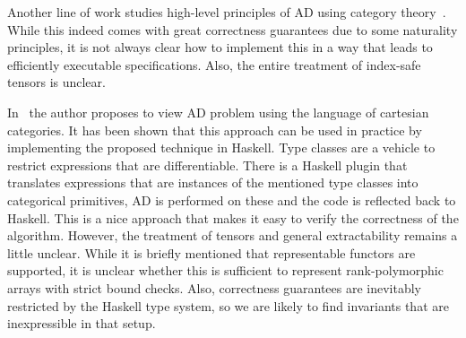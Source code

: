 Another line of work studies high-level principles of AD using
category theory~\cite{ad-theor1, ad-theor2, ad-theor3}.
While this indeed comes with great correctness guarantees due to
some naturality principles, it is not always clear how to implement
this in a way that leads to efficiently executable specifications.  Also, the
entire treatment of index-safe tensors is unclear.

In~\cite{ad-elliott} the author proposes to view AD problem using
the language of cartesian categories.  It has been shown that
this approach can be used in practice by implementing the proposed
technique in Haskell.  Type classes are a vehicle to restrict expressions
that are differentiable.  There is a Haskell plugin that translates
expressions that are instances of the mentioned type classes into
categorical primitives, AD is performed on these and the code is reflected
back to Haskell.  This is a nice approach that makes it easy
to verify the correctness of the algorithm.  However, the treatment
of tensors and general extractability remains a little unclear.
While it is briefly mentioned that representable functors
are supported, it is unclear whether this is sufficient to
represent rank-polymorphic arrays with strict bound checks.
Also, correctness guarantees are inevitably restricted by the
Haskell type system, so we are likely to find invariants that
are inexpressible in that setup.
